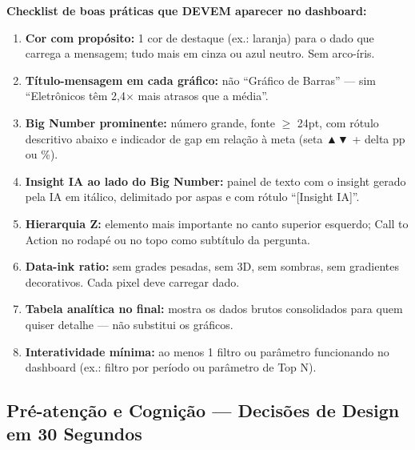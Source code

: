 \begin{SolvedBox}
\textbf{Checklist de boas práticas que DEVEM aparecer no dashboard:}

\begin{enumerate}
  \item \textbf{Cor com propósito:} 1 cor de destaque (ex.: laranja) para o dado que carrega
  a mensagem; tudo mais em cinza ou azul neutro. Sem arco-íris.
  \item \textbf{Título-mensagem em cada gráfico:} não ``Gráfico de Barras'' — sim
  ``Eletrônicos têm 2,4$\times$ mais atrasos que a média''.
  \item \textbf{Big Number prominente:} número grande, fonte $\geq$ 24pt, com rótulo descritivo
  abaixo e indicador de gap em relação à meta (seta ▲▼ + delta pp ou \%).
  \item \textbf{Insight IA ao lado do Big Number:} painel de texto com o insight gerado
  pela IA em itálico, delimitado por aspas e com rótulo ``[Insight IA]''.
  \item \textbf{Hierarquia Z:} elemento mais importante no canto superior esquerdo;
  Call to Action no rodapé ou no topo como subtítulo da pergunta.
  \item \textbf{Data-ink ratio:} sem grades pesadas, sem 3D, sem sombras, sem gradientes
  decorativos. Cada pixel deve carregar dado.
  \item \textbf{Tabela analítica no final:} mostra os dados brutos consolidados para
  quem quiser detalhe — não substitui os gráficos.
  \item \textbf{Interatividade mínima:} ao menos 1 filtro ou parâmetro funcionando no
  dashboard (ex.: filtro por período ou parâmetro de Top N).
\end{enumerate}
\end{SolvedBox}

\subsection{Pré-atenção e Cognição — Decisões de Design em 30 Segundos}

